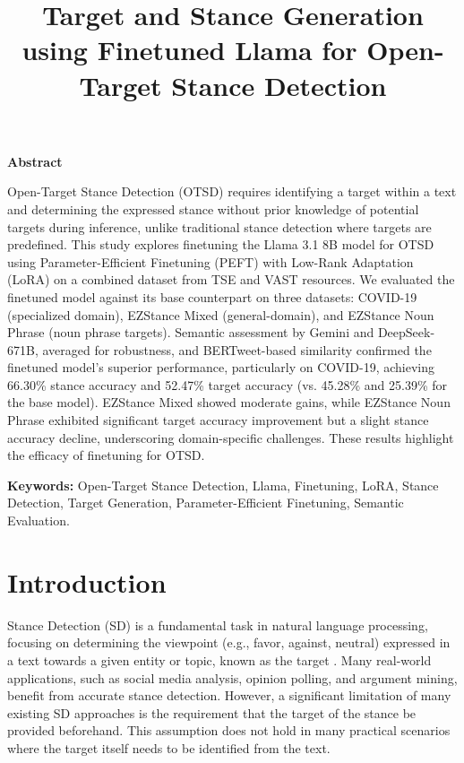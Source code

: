 \documentclass[twocolumn,11pt,letterpaper]{article}
\title{Target and Stance Generation using Finetuned Llama for Open-Target Stance Detection}
\renewenvironment{abstract}
 {\small
  \begin{center}%
  \bfseries Abstract\vspace{-.5em}\vspace{0pt}%
  \end{center}%
  \list{}{%
    \setlength{\leftmargin}{0.5cm}%
    \setlength{\rightmargin}{\leftmargin}%
    \setlength{\parsep}{0pt}%
    \setlength{\parskip}{0pt}%
    \setlength{\itemsep}{0pt}%
  }%
  \item\relax}
 {\endlist}
\begin{document}
\maketitle

\begin{abstract}
Open-Target Stance Detection (OTSD) requires identifying a target within a text and determining the expressed stance without prior knowledge of potential targets during inference, unlike traditional stance detection where targets are predefined. This study explores finetuning the Llama 3.1 8B model for OTSD using Parameter-Efficient Finetuning (PEFT) with Low-Rank Adaptation (LoRA) on a combined dataset from TSE and VAST resources. We evaluated the finetuned model against its base counterpart on three datasets: COVID-19 (specialized domain), EZStance Mixed (general-domain), and EZStance Noun Phrase (noun phrase targets). Semantic assessment by Gemini and DeepSeek-671B, averaged for robustness, and BERTweet-based similarity confirmed the finetuned model's superior performance, particularly on COVID-19, achieving 66.30\% stance accuracy and 52.47\% target accuracy (vs. 45.28\% and 25.39\% for the base model). EZStance Mixed showed moderate gains, while EZStance Noun Phrase exhibited significant target accuracy improvement but a slight stance accuracy decline, underscoring domain-specific challenges. These results highlight the efficacy of finetuning for OTSD.
\end{abstract}

\noindent\textbf{Keywords:} Open-Target Stance Detection, Llama, Finetuning, LoRA, Stance Detection, Target Generation, Parameter-Efficient Finetuning, Semantic Evaluation.


\section{Introduction}
\label{sec:introduction}

Stance Detection (SD) is a fundamental task in natural language processing, focusing on determining the viewpoint (e.g., favor, against, neutral) expressed in a text towards a given entity or topic, known as the target \cite{akash2024}. Many real-world applications, such as social media analysis, opinion polling, and argument mining, benefit from accurate stance detection. However, a significant limitation of many existing SD approaches is the requirement that the target of the stance be provided beforehand. This assumption does not hold in many practical scenarios where the target itself needs to be identified from the text.
\end{document}
